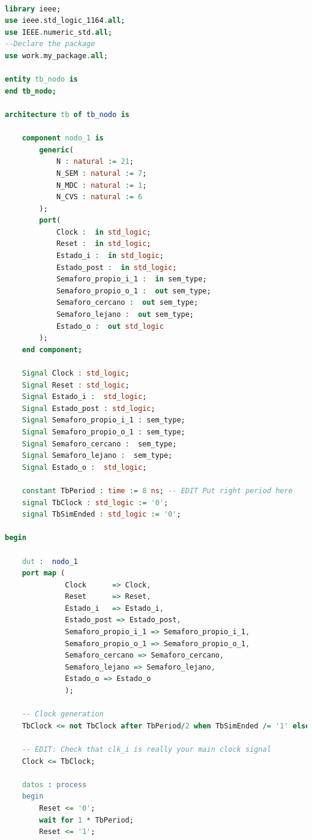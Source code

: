 			\begin{lstlisting}[language = vhdl,caption=Testbench del módulo nodo,label={lst:test_nodo}] 
				
library ieee;
use ieee.std_logic_1164.all;
use IEEE.numeric_std.all;
--Declare the package
use work.my_package.all;

entity tb_nodo is
end tb_nodo;

architecture tb of tb_nodo is

    component nodo_1 is
		generic(
			N : natural := 21;
			N_SEM : natural := 7;
			N_MDC : natural := 1;
			N_CVS : natural := 6
		);
		port(
			Clock :  in std_logic;
			Reset :  in std_logic;
			Estado_i :  in std_logic;
			Estado_post :  in std_logic;
			Semaforo_propio_i_1 :  in sem_type;
			Semaforo_propio_o_1 :  out sem_type;
			Semaforo_cercano :  out sem_type;
			Semaforo_lejano :  out sem_type;
			Estado_o :  out std_logic
		);
    end component;

    Signal Clock : std_logic;
	Signal Reset : std_logic;
	Signal Estado_i :  std_logic;
	Signal Estado_post : std_logic;
	Signal Semaforo_propio_i_1 : sem_type;
	Signal Semaforo_propio_o_1 : sem_type;
	Signal Semaforo_cercano :  sem_type;
	Signal Semaforo_lejano :  sem_type;
	Signal Estado_o :  std_logic;

    constant TbPeriod : time := 8 ns; -- EDIT Put right period here
    signal TbClock : std_logic := '0';
    signal TbSimEnded : std_logic := '0';

begin

    dut :  nodo_1
    port map (
			  Clock      => Clock,
              Reset      => Reset,
			  Estado_i   => Estado_i,
			  Estado_post => Estado_post,
			  Semaforo_propio_i_1 => Semaforo_propio_i_1,
			  Semaforo_propio_o_1 => Semaforo_propio_o_1,
			  Semaforo_cercano => Semaforo_cercano,
			  Semaforo_lejano => Semaforo_lejano,
			  Estado_o => Estado_o
			  );

    -- Clock generation
    TbClock <= not TbClock after TbPeriod/2 when TbSimEnded /= '1' else '0';

    -- EDIT: Check that clk_i is really your main clock signal
    Clock <= TbClock;

    datos : process
    begin
        Reset <= '0';
		wait for 1 * TbPeriod;
		Reset <= '1';
		

\end{lstlisting}
